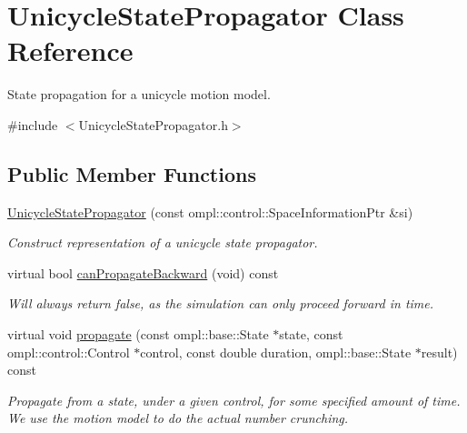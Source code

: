 \hypertarget{class_unicycle_state_propagator}{\section{\-Unicycle\-State\-Propagator \-Class \-Reference}
\label{class_unicycle_state_propagator}
}


\-State propagation for a unicycle motion model.  




{\ttfamily \#include $<$\-Unicycle\-State\-Propagator.\-h$>$}

\subsection*{\-Public \-Member \-Functions}
\begin{DoxyCompactItemize}
\item 
\hypertarget{class_unicycle_state_propagator_a9b1d547c131b9a95ec25b01ab9f77fa1}{\hyperlink{class_unicycle_state_propagator_a9b1d547c131b9a95ec25b01ab9f77fa1}{\-Unicycle\-State\-Propagator} (const ompl\-::control\-::\-Space\-Information\-Ptr \&si)}\label{class_unicycle_state_propagator_a9b1d547c131b9a95ec25b01ab9f77fa1}

\begin{DoxyCompactList}\small\item\em \-Construct representation of a unicycle state propagator. \end{DoxyCompactList}\item 
\hypertarget{class_unicycle_state_propagator_a7cfd8b23df04636daacc5a21162ea950}{virtual bool \hyperlink{class_unicycle_state_propagator_a7cfd8b23df04636daacc5a21162ea950}{can\-Propagate\-Backward} (void) const }\label{class_unicycle_state_propagator_a7cfd8b23df04636daacc5a21162ea950}

\begin{DoxyCompactList}\small\item\em \-Will always return false, as the simulation can only proceed forward in time. \end{DoxyCompactList}\item 
virtual void \hyperlink{class_unicycle_state_propagator_a8fd2854e51c8dc14ba21e40e45b14736}{propagate} (const ompl\-::base\-::\-State $\ast$state, const ompl\-::control\-::\-Control $\ast$control, const double duration, ompl\-::base\-::\-State $\ast$result) const 
\begin{DoxyCompactList}\small\item\em \-Propagate from a state, under a given control, for some specified amount of time. \-We use the motion model to do the actual number crunching. \end{DoxyCompactList}\end{DoxyCompactItemize}
